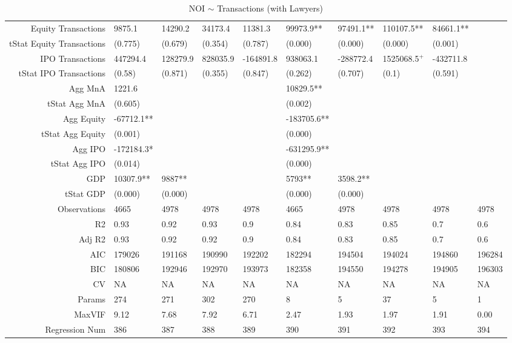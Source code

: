 \begin{table}[ht]
\begin{tabular}{rlllllllll}
  Equity Transactions & 9875.1 & 14290.2 & 34173.4 & 11381.3 & 99973.9** & 97491.1** & 110107.5** & 84661.1** &  \\ 
  tStat Equity Transactions & (0.775) & (0.679) & (0.354) & (0.787) & (0.000) & (0.000) & (0.000) & (0.001) &  \\ 
  IPO Transactions & 447294.4 & 128279.9 & 828035.9 & -164891.8 & 938063.1 & -288772.4 & 1525068.5$^{+}$ & -432711.8 &  \\ 
  tStat IPO Transactions & (0.58) & (0.871) & (0.355) & (0.847) & (0.262) & (0.707) & (0.1) & (0.591) &  \\ 
  Agg MnA & 1221.6 &  &  &  & 10829.5** &  &  &  &  \\ 
  tStat Agg MnA & (0.605) &  &  &  & (0.002) &  &  &  &  \\ 
  Agg Equity & -67712.1** &  &  &  & -183705.6** &  &  &  &  \\ 
  tStat Agg Equity & (0.001) &  &  &  & (0.000) &  &  &  &  \\ 
  Agg IPO & -172184.3* &  &  &  & -631295.9** &  &  &  &  \\ 
  tStat Agg IPO & (0.014) &  &  &  & (0.000) &  &  &  &  \\ 
  GDP & 10307.9** & 9887** &  &  & 5793** & 3598.2** &  &  &  \\ 
  tStat GDP & (0.000) & (0.000) &  &  & (0.000) & (0.000) &  &  &  \\ 
  Observations & 4665 & 4978 & 4978 & 4978 & 4665 & 4978 & 4978 & 4978 & 4978 \\ 
  R2 & 0.93 & 0.92 & 0.93 & 0.9 & 0.84 & 0.83 & 0.85 & 0.7 & 0.6 \\ 
  Adj R2 & 0.93 & 0.92 & 0.92 & 0.9 & 0.84 & 0.83 & 0.85 & 0.7 & 0.6 \\ 
  AIC & 179026 & 191168 & 190990 & 192202 & 182294 & 194504 & 194024 & 194860 & 196284 \\ 
  BIC & 180806 & 192946 & 192970 & 193973 & 182358 & 194550 & 194278 & 194905 & 196303 \\ 
  CV & NA & NA & NA & NA & NA & NA & NA & NA & NA \\ 
  Params & 274 & 271 & 302 & 270 & 8 & 5 & 37 & 5 & 1 \\ 
  MaxVIF & 9.12 & 7.68 & 7.92 & 6.71 & 2.47 & 1.93 & 1.97 & 1.91 & 0.00 \\ 
  Regression Num & 386 & 387 & 388 & 389 & 390 & 391 & 392 & 393 & 394 \\ 
   \hline
\end{tabular}
\caption{NOI $\sim$ Transactions (with Lawyers)} 
\end{table}
